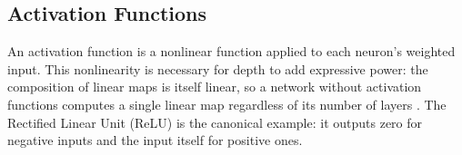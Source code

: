 \documentclass[12pt]{article}
\begin{document}
\subsection{Activation Functions}
\label{subsec:activation-functions} 



An activation function is a nonlinear function applied to each neuron's weighted input. 
This nonlinearity is necessary for depth to add expressive power: the composition of linear maps is itself linear, 
so a network without activation functions computes a single linear map regardless of its number of layers \parencite{dubey_activation_2022}.
The Rectified Linear Unit (ReLU) \parencite{nair_rectified_2010} is the canonical example: it outputs zero for negative inputs and the input itself for positive ones.
\end{document}

